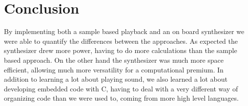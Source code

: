 \chapter{Conclusion}
By implementing both a sample based playback and an on board synthesizer we were able to quantify the differences between the approaches. As expected the synthesizer drew more power, having to do more calculations than the sample based approach. On the other hand the synthesizer was much more space efficient, allowing much more versatility for a computational premium. In addition to learning a lot about playing sound, we also learned a lot about developing embedded code with C, having to deal with a very different way of organizing code than we were used to, coming from more high level languages.


